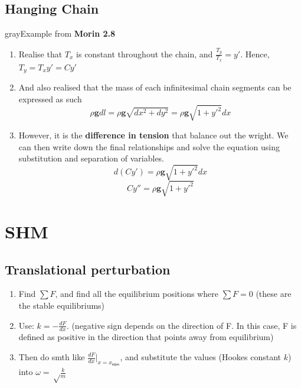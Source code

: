 \documentclass[12pt,a4paper]{extreport}
\numberwithin{equation}{chapter}
\renewcommand{\vec}[1]{\mathbf{#1}}
\begin{document}
    \subsection{Hanging Chain}
        \begin{mybox}{gray}{Example from \textbf{Morin 2.8}}
            \begin{enumerate}
                \item Realise that $T_x$ is constant throughout the chain, and $\frac{T_y}{T_x}=y'$. Hence, $T_y=T_x y' = C y'$
                \item And also realised that the mass of each infinitesimal chain segments can be expressed as such 
                \begin{equation}
                    \rho \vec{g} dl= \rho \vec{g} \sqrt {dx^2+dy^2}=\rho \vec{g} \sqrt {1+y'^2}dx
                \end{equation}
                \item However, it is the \textbf{difference in tension} that balance out the wright. We can then write down the final relationships and solve the equation using substitution and separation of variables. 
                \begin{equation}
                    d(Cy')= \rho \vec{g} \sqrt {1+y'^2}dx
                \end{equation}
                \begin{equation}
                    C y''= \rho \vec{g} \sqrt {1+y'^2}
                \end{equation}
            \end{enumerate}
        \end{mybox}
    
    \section{SHM}
        \subsection{Translational perturbation}
        \begin{enumerate}
            \item Find $\sum F$, and find all the equilibrium positions where $\sum F=0$ (these are the stable equilibriums)
            \item Use: $k=-\frac{dF}{dx}$. (negative sign depends on the direction of F. In this case, F is defined as positive in the direction that points away from equilibrium)
            \item Then do smth like $\frac{dF}{dx}\big|_{x=x_{\textsf{eqm}}}$, and substitute the values (Hookes constant $k$) into $\omega = \sqrt \frac{k}{m}$
        \end{enumerate}
\end{document}
